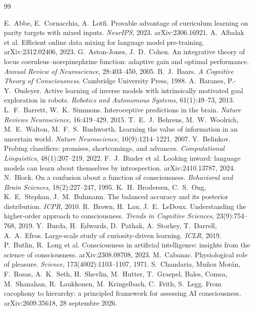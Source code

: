 \documentclass[11pt,a4paper]{article}
\begin{document}
\begin{thebibliography}{99}
\footnotesize\NoAutoSpacing
\setlength{\itemsep}{0.5pt}

 E.~Abbe, E.~Cornacchia, A.~Lotfi. Provable advantage of curriculum learning on parity targets with mixed inputs. \emph{NeurIPS}, 2023. arXiv:2306.16921.
 A.~Albalak et al. Efficient online data mixing for language model pre-training. arXiv:2312.02406, 2023.
 G.~Aston-Jones, J.~D.~Cohen. An integrative theory of locus coeruleus--norepinephrine function: adaptive gain and optimal performance. \emph{Annual Review of Neuroscience}, 28:403--450, 2005.
 B.~J.~Baars. \emph{A Cognitive Theory of Consciousness}. Cambridge University Press, 1988.
 A.~Baranes, P.-Y.~Oudeyer. Active learning of inverse models with intrinsically motivated goal exploration in robots. \emph{Robotics and Autonomous Systems}, 61(1):49--73, 2013.
 L.~F.~Barrett, W.~K.~Simmons. Interoceptive predictions in the brain. \emph{Nature Reviews Neuroscience}, 16:419--429, 2015.
 T.~E.~J.~Behrens, M.~W.~Woolrich, M.~E.~Walton, M.~F.~S.~Rushworth. Learning the value of information in an uncertain world. \emph{Nature Neuroscience}, 10(9):1214--1221, 2007.
 Y.~Belinkov. Probing classifiers: promises, shortcomings, and advances. \emph{Computational Linguistics}, 48(1):207--219, 2022.
 F.~J.~Binder et al. Looking inward: language models can learn about themselves by introspection. arXiv:2410.13787, 2024.
 N.~Block. On a confusion about a function of consciousness. \emph{Behavioral and Brain Sciences}, 18(2):227--247, 1995.
 K.~H.~Brodersen, C.~S.~Ong, K.~E.~Stephan, J.~M.~Buhmann. The balanced accuracy and its posterior distribution. \emph{ICPR}, 2010.
 R.~Brown, H.~Lau, J.~E.~LeDoux. Understanding the higher-order approach to consciousness. \emph{Trends in Cognitive Sciences}, 23(9):754--768, 2019.
 Y.~Burda, H.~Edwards, D.~Pathak, A.~Storkey, T.~Darrell, A.~A.~Efros. Large-scale study of curiosity-driven learning. \emph{ICLR}, 2019.
 P.~Butlin, R.~Long et al. Consciousness in artificial intelligence: insights from the science of consciousness. arXiv:2308.08708, 2023.
 M.~Cabanac. Physiological role of pleasure. \emph{Science}, 173(4002):1103--1107, 1971.
 S.~Chandaria, Muñoz Morán, F.~Rosas, A.~K.~Seth, H.~Shevlin, M.~Hutter, T.~Graepel, Bales, Comsa, M.~Shanahan, R.~Laukkonen, M.~Kringelbach, C.~Frith, S.~Legg. From cacophony to hierarchy: a principled framework for assessing AI consciousness. arXiv:2609.35618, 28 septembre 2026.

\end{thebibliography}
\end{document}
